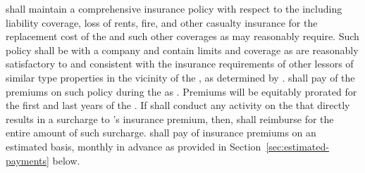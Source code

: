 \lessor shall maintain a comprehensive insurance policy with respect to the \building including liability coverage, loss of rents, fire, and other casualty insurance for the replacement cost of the \building and such other coverages as \lessor may reasonably require. Such policy shall be with a company and contain limits and coverage as are reasonably satisfactory to \lessor and consistent with the insurance requirements of other lessors of similar type properties in the vicinity of the \building, as determined by \lessor. \lessee shall pay \lesseesPercentage of the premiums on such policy during the \termOfLease as \additionalRent. Premiums will be equitably prorated for the first and last years of the \lease. If \lessee shall conduct any activity on the \premises that directly results in a surcharge to \lessor's insurance premium, then, \lessee shall reimburse \lessor for the entire amount of such surcharge. \lessee shall pay \lesseesPercentage of insurance premiums on an estimated basis, monthly in advance as provided in Section~\ref{sec:estimated-payments} below.
